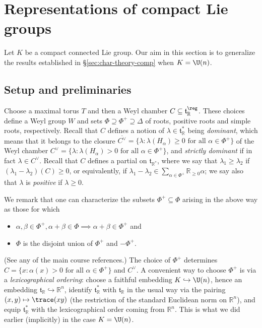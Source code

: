 \documentclass[reqno]{amsart} 
\begin{document}
\section{Representations of compact Lie groups}\label{sec:repr-comp-lie}
Let $K$ be a compact connected Lie group.  Our aim in this section is to generalize the results established in \S\ref{sec:char-theory-comp} when $K = \U(n)$.

\subsection{Setup and preliminaries}\label{sec:cnh2vo0riu}
Choose a maximal torus $T$ and then a Weyl chamber $C \subseteq \mathfrak{t}_{\mathbb{R}}^{\reg}$.  These choices define a Weyl group $W$ and sets $\Phi \supseteq \Phi^+ \supseteq \Delta$ of roots, positive roots and simple roots, respectively.  Recall that $C$ defines a notion of $\lambda \in \mathfrak{t}_{\mathbb{R}}^*$ being \emph{dominant}, which means that it belongs to the closure $\overline{C^\vee } = \{\lambda : \lambda(H_\alpha) \geq 0 \text{ for all } \alpha \in \Phi^+\}$ of the Weyl chamber $C^\vee = \{\lambda : \lambda(H_\alpha) > 0 \text{ for all } \alpha \in \Phi^+\}$, and \emph{strictly dominant} if in fact $\lambda \in C^\vee$.  Recall that $C$ defines a partial on $\mathfrak{t}_{\mathbb{R}^*}$, where we say that $\lambda_1 \geq \lambda_2$ if $(\lambda_1 - \lambda_2)(C) \geq 0$, or equivalently, if $\lambda_1 - \lambda_2 \in \sum_{\alpha \in \Phi^+} \mathbb{R}_{\geq 0} \alpha$; we say also that $\lambda$ is \emph{positive} if $\lambda \geq 0$.

We remark that one can characterize the subsets $\Phi^+ \subseteq \Phi$ arising in the above way as those for which
\begin{itemize}
\item $\alpha, \beta \in \Phi^+, \alpha + \beta \in \Phi \implies \alpha+\beta \in \Phi^+$ and
\item $\Phi$ is the disjoint union of $\Phi^+$ and $- \Phi^+$.
\end{itemize}
(See any of the main course references.)  The choice of $\Phi^+$ determines $C = \{x : \alpha(x) > 0 \text{ for all } \alpha \in \Phi^+ \}$ and $C^\vee$.  A convenient way to choose $\Phi^+$ is via a \emph{lexicographical ordering}: choose a faithful embedding $K \hookrightarrow \U(n)$, hence an embedding $\mathfrak{t}_{\mathbb{R}} \hookrightarrow \mathbb{R}^n$, identify $\mathfrak{t}_{\mathbb{R}}^*$ with $\mathfrak{t}_{\mathbb{R}}$ in the usual way via the pairing $(x,y) \mapsto \trace(x y)$ (the restriction of the standard Euclidean norm on $\mathbb{R}^n$), and equip $\mathfrak{t}_{\mathbb{R}}^*$ with the lexicographical order coming from $\mathbb{R}^n$.  This is what we did earlier (implicitly) in the case $K = \U(n)$.
\end{document}
